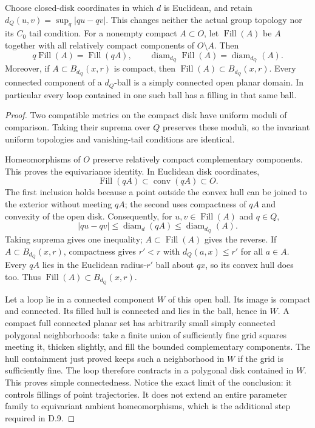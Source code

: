 Choose closed-disk coordinates in which $d$ is Euclidean, and retain
$d_Q(u,v)=\sup_q|qu-qv|$.  This changes neither the actual group
topology nor its $C_0$ tail condition.  For a nonempty compact
$A\subset O$, let $\operatorname{Fill}(A)$ be $A$ together with
all relatively compact components of $O\setminus A$.  Then
\[
 q\operatorname{Fill}(A)=\operatorname{Fill}(qA),\qquad
 \operatorname{diam}_{d_Q}\operatorname{Fill}(A)
 =\operatorname{diam}_{d_Q}(A).
\]
Moreover, if $A\subset B_{d_Q}(x,r)$ is compact, then
$\operatorname{Fill}(A)\subset B_{d_Q}(x,r)$.  Every connected
component of a $d_Q$-ball is a simply connected open planar domain.
In particular every loop contained in one such ball has a filling
in that same ball.
\begin{proof}
Two compatible metrics on the compact disk have uniform moduli of
comparison.  Taking their suprema over $Q$ preserves these moduli,
so the invariant uniform topologies and vanishing-tail conditions
are identical.

Homeomorphisms of $O$ preserve relatively compact complementary
components.  This proves the equivariance
identity.  In Euclidean disk coordinates,
\[
 \operatorname{Fill}(qA)\subset\operatorname{conv}(qA)\subset O.
\]
The first inclusion holds because a point outside the convex hull
can be joined to the exterior without meeting $qA$; the second
uses compactness of $qA$ and convexity of the open disk.  Consequently,
for $u,v\in\operatorname{Fill}(A)$ and $q\in Q$,
\[
 |qu-qv|\leq\operatorname{diam}_{d}(qA)
 \leq\operatorname{diam}_{d_Q}(A).
\]
Taking suprema gives one inequality; $A\subset\operatorname{Fill}(A)$
gives the reverse.  If $A\subset B_{d_Q}(x,r)$, compactness gives
$r'<r$ with $d_Q(a,x)\leq r'$ for all $a\in A$.  Every $qA$ lies
in the Euclidean radius-$r'$ ball about $qx$, so its convex hull
does too.  Thus $\operatorname{Fill}(A)\subset B_{d_Q}(x,r)$.

Let a loop lie in a connected component $W$ of this open ball.
Its image is compact and connected.  Its filled hull is connected
and lies in the ball, hence in $W$.  A compact full connected planar
set has arbitrarily small simply connected polygonal neighborhoods:
take a finite union of sufficiently fine grid squares meeting it,
thicken slightly, and fill the bounded complementary components.
The hull containment just proved keeps such a neighborhood in
$W$ if the grid is sufficiently fine.  The loop therefore contracts
in a polygonal disk contained in $W$.  This proves simple
connectedness.  Notice the exact limit of the conclusion: it
controls fillings of point trajectories.  It does not extend an
entire parameter family to equivariant ambient homeomorphisms,
which is the additional step required in D.9.
\end{proof}

